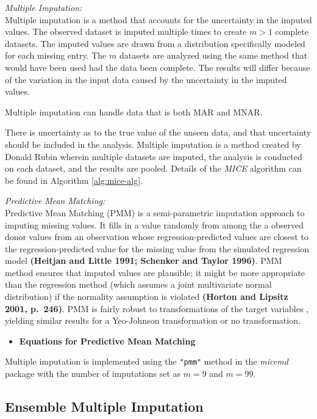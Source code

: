 \documentclass[12pt,]{article}
\providecommand{\tightlist}{%
  \setlength{\itemsep}{0pt}\setlength{\parskip}{0pt}}
\begin{document}
\emph{Multiple Imputation:}\\
Multiple imputation is a method that accounts for the uncertainty in the
imputed values. The observed dataset is imputed multiple times to create
\(m>1\) complete datasets. The imputed values are drawn from a
distribution specifically modeled for each missing entry. The \(m\)
datasets are analyzed using the same method that would have been used
had the data been complete. The results will differ because of the
variation in the input data caused by the uncertainty in the imputed
values.

Multiple imputation can handle data that is both MAR and MNAR.

There is uncertainty as to the true value of the unseen data, and that
uncertainty should be included in the analysis. Multiple imputation is a
method created by Donald Rubin wherein multiple datasets are imputed,
the analysis is conducted on each dataset, and the results are pooled.
Details of the \emph{MICE} algorithm can be found in Algorithm
\ref{alg:mice-alg}.

\emph{Predictive Mean Matching:}\\
Predictive Mean Matching (PMM) is a semi-parametric imputation approach
to imputing missing values. It fills in a value randomly from among the
a observed donor values from an observation whose regression-predicted
values are closest to the regression-predicted value for the missing
value from the simulated regression model \textbf{(Heitjan and Little
1991; Schenker and Taylor 1996)}. PMM method ensures that imputed values
are plausible; it might be more appropriate than the regression method
(which assumes a joint multivariate normal distribution) if the
normality assumption is violated \textbf{(Horton and Lipsitz 2001,
p.~246)}. PMM is fairly robust to transformations of the target
variables \autocite{van_buuren_flexible_2012}, yielding similar results
for a Yeo-Johnson transformation or no transformation.

\begin{itemize}
\tightlist
\item
  \textbf{Equations for Predictive Mean Matching}
\end{itemize}

Multiple imputation is implemented using the \texttt{"pmm"} method in
the \emph{micemd} package with the number of imputations set as \(m=9\)
and \(m=99\).

\subsection{Ensemble Multiple
Imputation}\label{ensemble-multiple-imputation}
\end{document}
